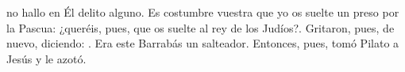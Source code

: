  no hallo en Él delito alguno. Es costumbre vuestra que yo os suelte un preso por la Pascua: ¿queréis, 
pues, que os suelte al rey de los Judíos?{\guillemotright}. Gritaron, pues, de nuevo, diciendo: . 
Era este Barrabás un salteador. Entonces, pues, tomó Pilato a Jesús y le azotó. 